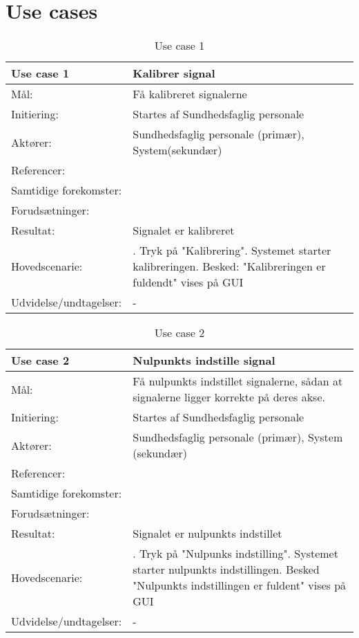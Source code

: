 \section{Use cases}
\begin{table}[h!]
\caption{Use case 1}\label{tab:tabel3}
\begin{tabular}{| l | >{\raggedright\arraybackslash}p{11cm} |}
   \hline
   \textbf{Use case 1} & \textbf{Kalibrer signal}\\ \hline
   Mål: & Få kalibreret signalerne \\ \hline
   Initiering: & Startes af Sundhedsfaglig personale\\ \hline
   Aktører:& Sundhedsfaglig personale (primær), System(sekundær)\\ \hline
   Referencer: &  \\ \hline
   Samtidige forekomster: & \\\hline
   Forudsætninger: & \\ \hline
   Resultat:& Signalet er kalibreret\\ \hline
   Hovedscenarie:& 
1. Tryk på "Kalibrering"\newline
2. Systemet starter kalibreringen\newline
3. Besked: "Kalibreringen er fuldendt" vises på GUI\\\hline
Udvidelse/undtagelser: & -\\\hline
\end{tabular}
\end{table}

\begin{table}[h!]
\caption{Use case 2}\label{tab:tabel3}
\begin{tabular}{| l | >{\raggedright\arraybackslash}p{11cm} |}
   \hline
   \textbf{Use case 2} & \textbf{Nulpunkts indstille signal}\\ \hline
   Mål: & Få nulpunkts indstillet signalerne, sådan at signalerne ligger korrekte på deres akse. \\ \hline
   Initiering: & Startes af Sundhedsfaglig personale\\ \hline
   Aktører:& Sundhedsfaglig personale (primær), System (sekundær)\\ \hline
   Referencer: & \\ \hline
   Samtidige forekomster: & \\\hline
   Forudsætninger: & \\ \hline
   Resultat:& Signalet er nulpunkts indstillet\\ \hline
   Hovedscenarie:& 
1. Tryk på "Nulpunks indstilling"\newline
2. Systemet starter nulpunkts indstillingen\newline
3. Besked "Nulpunkts indstillingen er fuldent" vises på GUI\\\hline
Udvidelse/undtagelser: & -\\\hline
\end{tabular}
\end{table}

